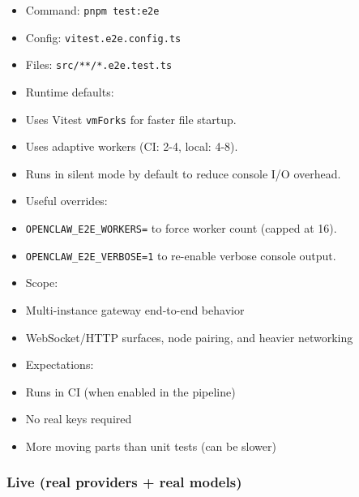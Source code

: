 \begin{itemize}
  \item Command: \texttt{pnpm test:e2e}
  \item Config: \texttt{vitest.e2e.config.ts}
  \item Files: \texttt{src/**/*.e2e.test.ts}
  \item Runtime defaults:
  \item Uses Vitest \texttt{vmForks} for faster file startup.
  \item Uses adaptive workers (CI: 2-4, local: 4-8).
  \item Runs in silent mode by default to reduce console I/O overhead.
  \item Useful overrides:
  \item \texttt{OPENCLAW\_E2E\_WORKERS=} to force worker count (capped at 16).
  \item \texttt{OPENCLAW\_E2E\_VERBOSE=1} to re-enable verbose console output.
  \item Scope:
  \item Multi-instance gateway end-to-end behavior
  \item WebSocket/HTTP surfaces, node pairing, and heavier networking
  \item Expectations:
  \item Runs in CI (when enabled in the pipeline)
  \item No real keys required
  \item More moving parts than unit tests (can be slower)
\end{itemize}


\subsubsection{Live (real providers + real models)}


